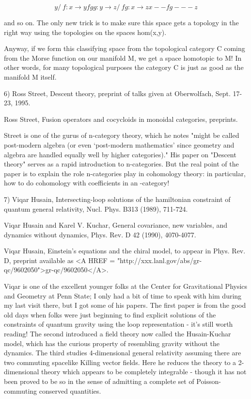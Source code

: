 $$

      y
     / \                       f: x \to  y
    f   g                      g: y \to  z
   /     \                    fg: x \to  z
  x--fg---z

$$
    
and so on.  The only new trick is to make sure this space gets a
topology in the right way using the topologies on the spaces hom(x,y).  

Anyway, if we form this classifying space from the topological
category C coming from the Morse function on our manifold M, we get a
space homotopic to M!  In other words, for many topological purposes the
category C is just as good as the manifold M itself.

6) Ross Street, Descent theory, preprint of talks given at Oberwolfach,
Sept. 17-23, 1995.  

Ross Street, Fusion operators and cocycloids in monoidal categories, 
preprints.

Street is one of the gurus of n-category theory, which he notes "might
be called post-modern algebra (or even `post-modern mathematics' since
geometry and algebra are handled equally well by higher categories)."
His paper on "Descent theory" serves as a rapid introduction to
n-categories.  But the real point of the paper is to explain the role
n-categories play in cohomology theory: in particular, how to do
cohomology with coefficients in an \omega -category!

7) Viqar Husain, Intersecting-loop solutions of the hamiltonian constraint
of quantum general relativity, Nucl. Phys. B313 (1989), 711-724.

Viqar Husain and Karel V. Kuchar, General covariance, new variables,
and dynamics without dynamics, Phys. Rev. D 42 (1990), 4070-4077.

Viqar Husain, Einstein's equations and the chiral model, to appear in
Phys. Rev. D, preprint available as <A HREF = "http://xxx.lanl.gov/abs/gr-qc/9602050">gr-qc/9602050</A>.

Viqar is one of the excellent younger folks at the Center for
Gravitational Physics and Geometry at Penn State; I only had a bit of
time to speak with him during my last visit there, but I got some of his
papers.  The first paper is from the good old days when folks were just
beginning to find explicit solutions of the constraints of quantum
gravity using the loop representation - it's still worth reading!  The
second introduced a field theory now called the Husain-Kuchar model,
which has the curious property of resembling gravity without the
dynamics.  The third studies 4-dimensional general relativity assuming
there are two commuting spacelike Killing vector fields.  Here he
reduces the theory to a 2-dimensional theory which appears to be completely
integrable - though it has not been proved to be so in the sense of
admitting a complete set of Poisson-commuting conserved quantities.  

